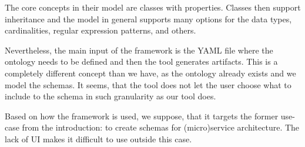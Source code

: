 

The core concepts in their model are classes with properties. Classes then support inheritance and the model in general supports many options for the data types, cardinalities, regular expression patterns, and others.

Nevertheless, the main input of the framework is the YAML file where the ontology needs to be defined and then the tool generates artifacts. This is a completely different concept than we have, as the ontology already exists and we model the schemas. It seems, that the tool does not let the user choose what to include to the schema in such granularity as our tool does.

Based on how the framework is used, we suppose, that it targets the former use-case from the introduction: to create schemas for (micro)service architecture. The lack of UI makes it difficult to use outside this case.

